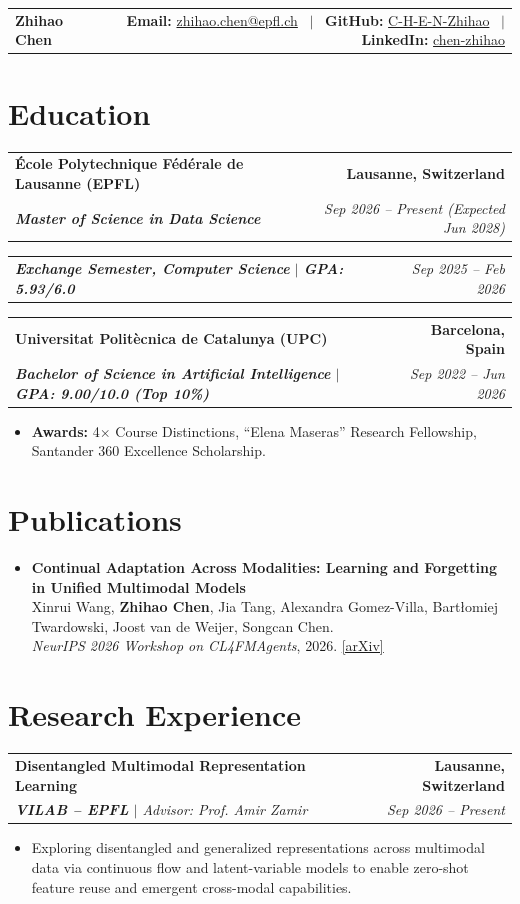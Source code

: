 \documentclass[a4paper,10pt]{article}
\makeatletter
\newcommand{\cvheader}[4]{%
  \noindent
  \begin{tabular*}{\textwidth}{@{}l@{\extracolsep{\fill}}r@{}}
    {\huge\bfseries\color{darkred} #1} &
    {\footnotesize\color{darkgray}
      \textbf{Email:} \href{mailto:#2}{#2} \ $|$ \
      \textbf{GitHub:} \href{https://github.com/#3}{#3} \ $|$ \
      \textbf{LinkedIn:} \href{https://linkedin.com/in/#4}{#4}}
  \end{tabular*}
  \vspace{-4pt}
}
\newcommand{\cvsubheading}[4]{%
  \vspace{2.5pt}
  \begin{tabular*}{\textwidth}{@{}l@{\extracolsep{\fill}}r@{}}
    \textbf{\color{darkred}#1} & {\footnotesize\textbf{\color{darkgray}#2}} \\
    \textit{\footnotesize\color{darkgray}#3} & \textit{\footnotesize\color{lightgray}#4} \\
  \end{tabular*}
  \vspace{-4pt}
}
\newcommand{\cvsubdegree}[2]{%
  \vspace{1.5pt}
  \begin{tabular*}{\textwidth}{@{}l@{\extracolsep{\fill}}r@{}}
    \textit{\footnotesize\color{darkgray}#1} & \textit{\footnotesize\color{lightgray}#2} \\
  \end{tabular*}
  \vspace{-4pt}
}
\newcommand{\cvitem}[1]{%
  \item[\color{epflred}\footnotesize$\triangleright$] {\small #1}
}
\makeatother
\begin{document}
\color{darkgray}

\cvheader{Zhihao Chen}{zhihao.chen@epfl.ch}{C-H-E-N-Zhihao}{chen-zhihao}

\section{Education}

\cvsubheading
{École Polytechnique Fédérale de Lausanne (EPFL)}{Lausanne, Switzerland}
{\textbf{Master of Science in Data Science}}{Sep 2026 -- Present (Expected Jun 2028)}

\cvsubdegree
{\textbf{Exchange Semester, Computer Science} $|$ \textbf{GPA: 5.93/6.0}}{Sep 2025 -- Feb 2026}

\cvsubheading
{Universitat Politècnica de Catalunya (UPC)}{Barcelona, Spain}
{\textbf{Bachelor of Science in Artificial Intelligence} $|$ \textbf{GPA: 9.00/10.0 (Top 10\%)}}{Sep 2022 -- Jun 2026}
\begin{itemize}
    \cvitem{\textbf{Awards:} 4$\times$ Course Distinctions, ``Elena Maseras'' Research Fellowship, Santander 360\textordmasculine{} Excellence Scholarship.}
\end{itemize}

\section{Publications}

\begin{itemize}
    \cvitem{\textbf{Continual Adaptation Across Modalities: Learning and Forgetting in Unified Multimodal Models}\\
    Xinrui Wang, \textbf{Zhihao Chen}, Jia Tang, Alexandra Gomez-Villa, Bart\l{}omiej Twardowski, Joost van de Weijer, Songcan Chen.\\
    \textit{NeurIPS 2026 Workshop on CL4FMAgents}, 2026.} \href{https://arxiv.org/abs/2610.38436}{[arXiv]}
\end{itemize}

\section{Research Experience}

\cvsubheading
{Disentangled Multimodal Representation Learning}{Lausanne, Switzerland}
{\textbf{VILAB -- EPFL} $|$ Advisor: Prof. Amir Zamir}{Sep 2026 -- Present}
\begin{itemize}
    \cvitem{Exploring disentangled and generalized representations across multimodal data via continuous flow and latent-variable models to enable zero-shot feature reuse and emergent cross-modal capabilities.}
\end{itemize}
\end{document}
